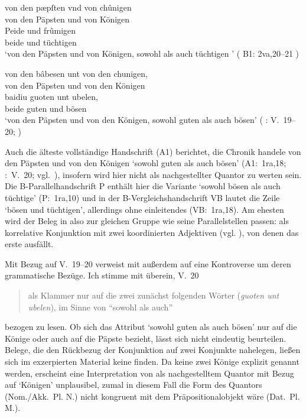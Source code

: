 \begin{exe}
\ex \begin{xlist}
	\ex \label{ex:kcexcl1}
		\gll von den pæpſten vnd von chûnigen \\
			von den Päpsten und von Königen \\
	\sn \gll Peide und frûmigen \\
			beide und tüchtigen \\
		\trans `von den Päpsten und von Königen, sowohl als auch tüchtigen
			'
			(%
				B1: 2va,20--21%
			)

	\ex \label{ex:kcexcl1_schroeder}
		\gll von den bâbesen unt von den chunigen, \\
			von den Päpsten und von den Königen \\
	\sn \gll baidiu guoten unt ubelen, \\
			beide guten und bösen \\
		\trans `von den Päpsten und von den Königen, sowohl guten als auch
			bösen'
			(%
				\KC: V.~19--20;
				\cite[79]{schroeder1895}%
			)
\end{xlist}
\end{exe}

Auch die älteste vollständige Handschrift (A1) berichtet, die Chronik handele
von den Päpsten und von den Königen  `sowohl guten
als auch bösen' (A1:~1ra,18; \KC:~V.~20; vgl.~\cite[79]{schroeder1895}),
insofern wird  hier nicht als nachgestellter Quantor zu werten
sein. Die B-\allowbreak{}Pa\-ral\-lel\-hand\-schrift P enthält hier die
Variante  `sowohl bösen als auch
tüchtige' (P:~1ra,10) und in der B-Vergleichshandschrift VB lautet
die Zeile  `bösen und tüchtigen', allerdings ohne
einleitendes  (VB:~1ra,18). Am ehesten wird der Beleg in
 also zur gleichen Gruppe wie seine Parallelstellen passen:
 als korrelative Konjunktion mit zwei koordinierten
Adjektiven
(vgl. ), von denen das erste ausfällt.

Mit Bezug auf V.~19--20 verweist \citet[26, Fußnote 45]{weis2022} mit
\citet[55, Fußnote 87]{dickhutbielsky2015} außerdem auf eine Kontroverse um
deren grammatische Bezüge. Ich stimme mit \citet[239]{haupt2019} überein, V.~20
\blockquote{als Klammer nur auf die zwei zunächst folgenden Wörter
(\textit{guoten unt ubelen}), im Sinne von \enquote{sowohl als auch}} bezogen
zu lesen. Ob sich das Attribut  `sowohl guten als
auch bösen' nur auf die Könige oder auch auf die Päpste bezieht, lässt sich
nicht eindeutig beurteilen. Belege, die den Rückbezug der
Konjunktion  auf zwei Konjunkte nahelegen, ließen sich im
exzerpierten Material keine finden. Da keine zwei Könige explizit genannt
werden, erscheint eine Interpretation von  als nachgestelltem
Quantor mit Bezug auf  `Königen' unplausibel, zumal in diesem
Fall die Form des Quantors (Nom./Akk.~Pl. N.) nicht kongruent mit dem
Präpositionalobjekt wäre (Dat.~Pl. M.).

